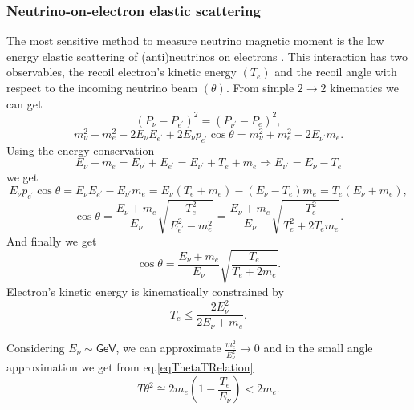 \subsubsection{Neutrino-on-electron elastic scattering}
The most sensitive method to measure neutrino magnetic moment is the low energy elastic scattering of (anti)neutrinos on electrons \cite{nuElmagInt2015.pdf}. This interaction has two observables, the recoil electron's kinetic energy $\left(T_e\right)$ and the recoil angle with respect to the incoming neutrino beam $\left(\theta\right)$. From simple $2\rightarrow 2$ kinematics we can get
\begin{equation}
\left(P_{\nu}-P_{e^{\prime}}\right)^2=\left(P_{\nu^{\prime}}-P_e\right)^2,
\end{equation}
\begin{equation}
m_{\nu}^2+m_e^2-2E_{\nu}E_{e^{\prime}}+2E_{\nu}p_{e^{\prime}}\cos\theta=m_{\nu}^2+m_e^2-2E_{\nu^{\prime}}m_e.
\end{equation}
Using the energy conservation
\begin{equation}
E_{\nu}+m_e=E_{\nu^{\prime}}+E_{e^{\prime}}=E_{\nu^{\prime}}+T_e+m_e\Rightarrow E_{\nu^{\prime}}=E_{\nu}-T_e
\end{equation}
we get
\begin{equation}
E_{\nu}p_{e^{\prime}}\cos\theta=E_{\nu}E_{e^{\prime}}-E_{\nu^{\prime}}m_e=E_{\nu}\left(T_e+m_e\right)-\left(E_{\nu}-T_e\right)m_e=T_e\left(E_{\nu}+m_e\right),
\end{equation}
\begin{equation}
\cos\theta=\frac{E_{\nu}+m_e}{E_{\nu}}\sqrt{\frac{T_e^2}{E_{e^{\prime}}^2-m_e^2}}=\frac{E_{\nu}+m_e}{E_{\nu}}\sqrt{\frac{T_e^2}{T_e^2+2T_em_e}}.
\end{equation}
And finally we get
\begin{equation}\label{eqThetaTRelation}
\cos\theta=\frac{E_{\nu}+m_e}{E_{\nu}}\sqrt{\frac{T_e}{T_e+2m_e}}.
\end{equation}
Electron's kinetic energy is kinematically constrained by
\begin{equation}
T_e\leq\frac{2E_{\nu}^2}{2E_{\nu}+m_e}.
\end{equation}

Considering $E_{\nu}\sim\textsf{GeV}$, we can approximate $\frac{m_e^2}{E_{\nu}^2}\rightarrow 0$ and in the small angle approximation we get from eq.\ref{eqThetaTRelation} 
\begin{equation}\label{eqTThetaSqExp}
T\theta^2\cong 2m_e\left(1-\frac{T_e}{E_{\nu}}\right)<2m_e.
\end{equation}

